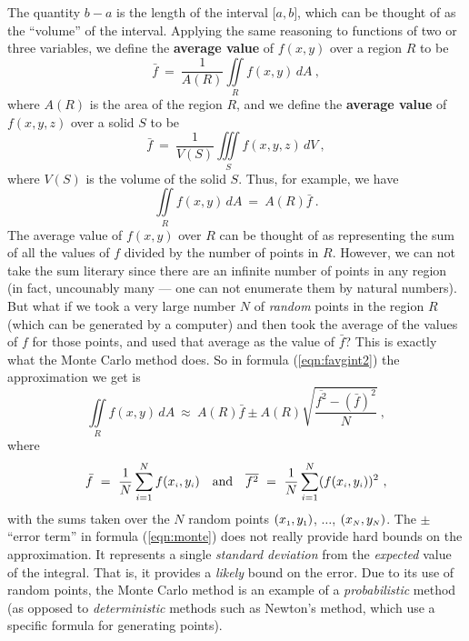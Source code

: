 The quantity $b-a$ is the length of the interval $\lbrack a,b \rbrack$, which can be thought of as the ``volume'' of
the interval. Applying the same reasoning to functions of two or three variables, we define the \textbf{average
value} of $f(x,y)$ over a region $R$ to be
\begin{equation}\label{eqn:favg2}
 \bar{f} ~=~ \frac{1}{A(R)}\iint\limits_{R} f(x,y)\,dA ~,
\end{equation}
where $A(R)$ is the area of the region $R$, and we define the \textbf{average
value} of $f(x,y,z)$ over a solid $S$ to be
\begin{equation}\label{eqn:favg3}
 \bar{f} ~=~ \frac{1}{V(S)}\iiint\limits_{S} f(x,y,z)\,dV ~,
\end{equation}
where $V(S)$ is the volume of the solid $S$. Thus, for example, we have
\begin{equation}\label{eqn:favgint2}
 \iint\limits_{R} f(x,y)\,dA ~=~ A(R)\bar{f} ~.
\end{equation}
The average value of $f(x,y)$ over $R$ can be thought of as representing the sum of all the values of $f$ divided by the number of points in $R$. 
However, we can not take the sum literary since there are an infinite number of points in any region (in fact, uncounably many --- one can not enumerate them by natural numbers). 
But what if we took a very large number $N$ of \emph{random} points in the region $R$ (which can be generated by a computer) and then took the
average of the values of $f$ for those points, and used that
average as the value of $\bar{f}$? This is exactly what the Monte Carlo method does. So in formula (\ref{eqn:favgint2})
the approximation we get is
\begin{equation}\label{eqn:monte}
 \iint\limits_{R} f(x,y)\,dA ~\approx~ A(R)\bar{f} \pm A(R)\sqrt{\frac{\overline{f^2} - (\bar{f})^2}{N}} ~,
\end{equation}
where
\begin{equation}
 \bar{f} ~=~ \frac{1}{N}\sum_{i=1}^N f(x_{\scriptscriptstyle i},y_{\scriptscriptstyle i}) \quad \text{and} \quad \overline{f^2} ~=~
 \frac{1}{N} \sum_{i=1}^N (f(x_{\scriptscriptstyle i},y_{\scriptscriptstyle i}))^2~,
\end{equation}
with the sums taken over the $N$ random points $(x_{\scriptscriptstyle 1},y_{\scriptscriptstyle 1})$, $\ldots$, $(x_{\scriptscriptstyle N},y_{\scriptscriptstyle N})$.
The $\pm$ ``error term'' in formula (\ref{eqn:monte}) does not really provide
hard bounds on the approximation. It represents a single \emph{standard deviation} from the \emph{expected} value of the
integral. That is, it provides a \emph{likely} bound on the error. Due to its use of random points, the Monte Carlo
method is an example of a \emph{probabilistic} method (as opposed to \emph{deterministic} methods such as Newton's
method, which use a specific formula for generating points).


